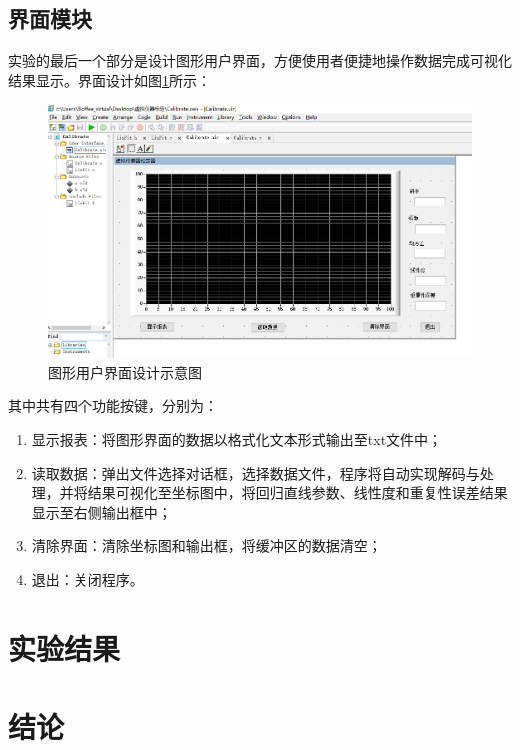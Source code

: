 \documentclass[a4paper,12pt,twoside]{article}%
\begin{document}
\subsection{界面模块}
实验的最后一个部分是设计图形用户界面，方便使用者便捷地操作数据完成可视化结果显示。界面设计如图\ref{fig:ui}所示：
\begin{figure}[H]
  \centering
  \includegraphics[width=\textwidth]{图形用户界面设计示意图.png}
  \caption{图形用户界面设计示意图}
  \label{fig:ui}
\end{figure}
其中共有四个功能按键，分别为：
\begin{enumerate}
  \item 显示报表：将图形界面的数据以格式化文本形式输出至txt文件中；
  \item 读取数据：弹出文件选择对话框，选择数据文件，程序将自动实现解码与处理，并将结果可视化至坐标图中，将回归直线参数、线性度和重复性误差结果显示至右侧输出框中；
  \item 清除界面：清除坐标图和输出框，将缓冲区的数据清空；
  \item 退出：关闭程序。
\end{enumerate}
\section{实验结果}

\section{结论}
\end{document}
